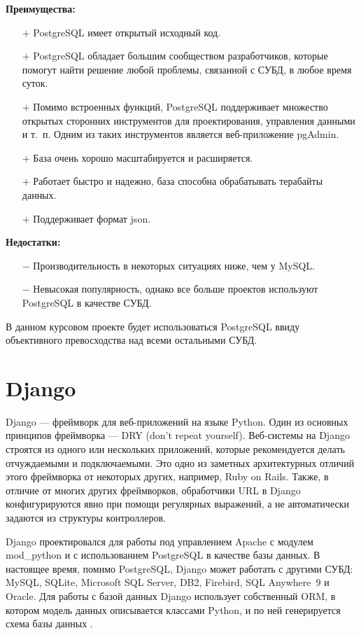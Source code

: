 \textbf{Преимущества:}
\begin{itemize}
	\item[$+$] PostgreSQL имеет открытый исходный код.
	\item[$+$] PostgreSQL обладает большим сообществом разработчиков, которые помогут найти решение любой проблемы, связанной с СУБД, в любое время суток.
	\item[$+$] Помимо встроенных функций, PostgreSQL поддерживает множество открытых сторонних инструментов для проектирования, управления данными и т.~п.
	Одним из таких инструментов является веб-приложение pgAdmin.
	\item[$+$] База очень хорошо масштабируется и расширяется.
	\item[$+$] Работает быстро и надежно, база способна обрабатывать терабайты данных.
	\item[$+$] Поддерживает формат json.
\end{itemize}

\textbf{Недостатки:}
\begin{itemize}
	\item[$-$] Производительность в некоторых ситуациях ниже, чем у MySQL.
	\item[$-$] Невысокая популярность, однако все больше проектов используют PostgreSQL в качестве СУБД.
\end{itemize}

В данном курсовом проекте будет использоваться PostgreSQL ввиду объективного превосходства над всеми остальными СУБД.

\section{Django}

Django — фреймворк для веб-приложений на языке Python.
Один из основных принципов фреймворка — DRY (don't repeat yourself).
Веб-системы на Django строятся из одного или нескольких приложений, которые рекомендуется делать отчуждаемыми и подключаемыми.
Это одно из заметных архитектурных отличий этого фреймворка от некоторых других, например, Ruby on Rails.
Также, в отличие от многих других фреймворков, обработчики URL в Django конфигурируются явно при помощи регулярных выражений, а не автоматически задаются из структуры контроллеров.

Django проектировался для работы под управлением Apache с модулем mod\_python и с использованием PostgreSQL в качестве базы данных.
В настоящее время, помимо PostgreSQL, Django может работать с другими СУБД: MySQL, SQLite, Microsoft SQL Server, DB2, Firebird, SQL Anywhere~9 и Oracle.
Для работы с базой данных Django использует собственный ORM, в котором модель данных описывается классами Python, и по ней генерируется схема базы данных \cite{saglaev}.

